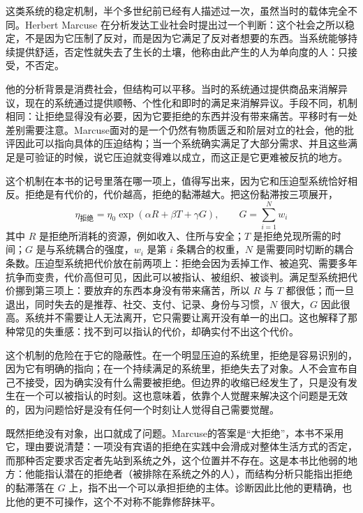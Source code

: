 
这类系统的稳定机制，半个多世纪前已经有人描述过一次，虽然当时的载体完全不同。Herbert Marcuse 在分析发达工业社会时提出过一个判断：这个社会之所以稳定，不是因为它压制了反对，而是因为它满足了反对者想要的东西。当系统能够持续提供舒适，否定性就失去了生长的土壤，他称由此产生的人为单向度的人：只接受，不否定。\cite{marcuse1964onedimensional}

他的分析背景是消费社会，但结构可以平移。当时的系统通过提供商品来消解异议，现在的系统通过提供顺畅、个性化和即时的满足来消解异议。手段不同，机制相同：让拒绝显得没有必要，因为它要拒绝的东西并没有带来痛苦。平移时有一处差别需要注意。Marcuse面对的是一个仍然有物质匮乏和阶层对立的社会，他的批评因此可以指向具体的压迫结构；当一个系统确实满足了大部分需求、并且这些满足是可验证的时候，说它压迫就变得难以成立，而这正是它更难被反抗的地方。

这个机制在本书的记号里落在哪一项上，值得写出来，因为它和压迫型系统恰好相反。拒绝是有代价的，代价越高，拒绝的黏滞越大。把这份黏滞按三项展开，
\begin{equation}
\eta_{\text{拒绝}}=\eta_0\exp(\alpha R+\beta T+\gamma G),\qquad G=\sum_{i=1}^{N}w_i
\end{equation}
其中 $R$ 是拒绝所消耗的资源，例如收入、住所与安全；$T$ 是拒绝兑现所需的时间；$G$ 是与系统耦合的强度，$w_i$ 是第 $i$ 条耦合的权重，$N$ 是需要同时切断的耦合条数。压迫型系统把代价放在前两项上：拒绝会因为丢掉工作、被追究、需要多年抗争而变贵，代价高但可见，因此可以被指认、被组织、被谈判。满足型系统把代价挪到第三项上：要放弃的东西本身没有带来痛苦，所以 $R$ 与 $T$ 都很低；而一旦退出，同时失去的是推荐、社交、支付、记录、身份与习惯，$N$ 很大，$G$ 因此很高。系统并不需要让人无法离开，它只需要让离开没有单一的出口。这也解释了那种常见的失重感：找不到可以指认的代价，却确实付不出这个代价。

这个机制的危险在于它的隐蔽性。在一个明显压迫的系统里，拒绝是容易识别的，因为它有明确的指向；在一个持续满足的系统里，拒绝失去了对象。人不会宣布自己不接受，因为确实没有什么需要被拒绝。但边界的收缩已经发生了，只是没有发生在一个可以被指认的时刻。这也意味着，依靠个人觉醒来解决这个问题是无效的，因为问题恰好是没有任何一个时刻让人觉得自己需要觉醒。

既然拒绝没有对象，出口就成了问题。Marcuse的答案是“大拒绝”，本书不采用它，理由要说清楚：一项没有宾语的拒绝在实践中会滑成对整体生活方式的否定，而那种否定要求否定者先站到系统之外，这个位置并不存在。这是本书比他弱的地方：他能指认潜在的拒绝者（被排除在系统之外的人），而结构分析只能指出拒绝的黏滞落在 $G$ 上，指不出一个可以承担拒绝的主体。诊断因此比他的更精确，也比他的更不可操作，这个不对称不能靠修辞抹平。

